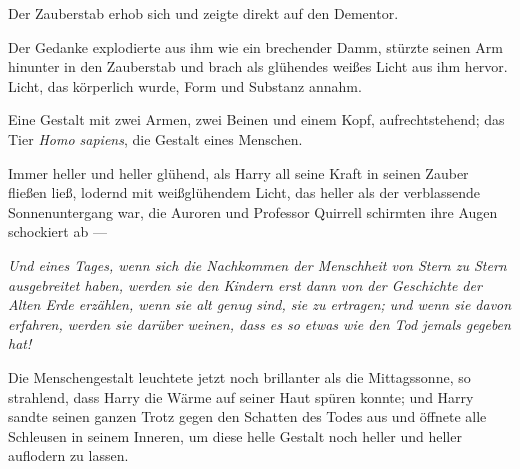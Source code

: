 Der Zauberstab erhob sich und zeigte direkt auf den Dementor.


Der Gedanke explodierte aus ihm wie ein brechender Damm, stürzte seinen Arm hinunter in den Zauberstab und brach als glühendes weißes Licht aus ihm hervor. Licht, das körperlich wurde, Form und Substanz annahm.

Eine Gestalt mit zwei Armen, zwei Beinen und einem Kopf, aufrechtstehend; das Tier \emph{Homo sapiens}, die Gestalt eines Menschen.

Immer heller und heller glühend, als Harry all seine Kraft in seinen Zauber fließen ließ, lodernd mit weißglühendem Licht, das heller als der verblassende Sonnenuntergang war, die Auroren und Professor Quirrell schirmten ihre Augen schockiert ab —

\emph{Und eines Tages, wenn sich die Nachkommen der Menschheit von Stern zu Stern ausgebreitet haben, werden sie den Kindern erst dann von der Geschichte der Alten Erde erzählen, wenn sie alt genug sind, sie zu ertragen; und wenn sie davon erfahren, werden sie darüber weinen, dass es so etwas wie den Tod jemals gegeben hat!}

Die Menschengestalt leuchtete jetzt noch brillanter als die Mittagssonne, so strahlend, dass Harry die Wärme auf seiner Haut spüren konnte; und Harry sandte seinen ganzen Trotz gegen den Schatten des Todes aus und öffnete alle Schleusen in seinem Inneren, um diese helle Gestalt noch heller und heller auflodern zu lassen.

